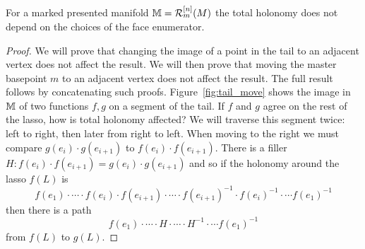 \begin{myprop}
For a marked presented manifold \( \mathbb{M}=\mathcal{R}_m^{[n]}(M) \) the total holonomy does not depend on the choices of the face enumerator.
\end{myprop}
\begin{proof}
We will prove that changing the image of a point in the tail to an adjacent vertex does not affect the result. We will then prove that moving the master basepoint \( m \) to an adjacent vertex does not affect the result. The full result follows by concatenating such proofs. Figure~\ref{fig:tail_move} shows the image in \( \mathbb{M} \) of two functions \( f, g \) on a segment of the tail. If \( f \) and \( g \) agree on the rest of the lasso, how is total holonomy affected? We will traverse this segment twice: left to right, then later from right to left. When moving to the right we must compare \( g(e_i)\cdot g(e_{i+1}) \) to \( f(e_i)\cdot f(e_{i+1}) \). There is a filler \( H:f(e_i)\cdot f(e_{i+1})=g(e_i)\cdot g(e_{i+1}) \) and so if the holonomy around the lasso \( f(L) \) is \[ f(e_1)\cdot\cdots\cdot f(e_i)\cdot f(e_{i+1})\cdot\cdots\cdot f(e_{i+1})^{-1}\cdot f(e_i)^{-1}\cdot\cdots f(e_1)^{-1} \] then there is a path \[ f(e_1)\cdot\cdots\cdot H\cdot\cdots\cdot H^{-1}\cdot\cdots f(e_1)^{-1} \] from \( f(L) \) to \( g(L) \).
\end{proof}

